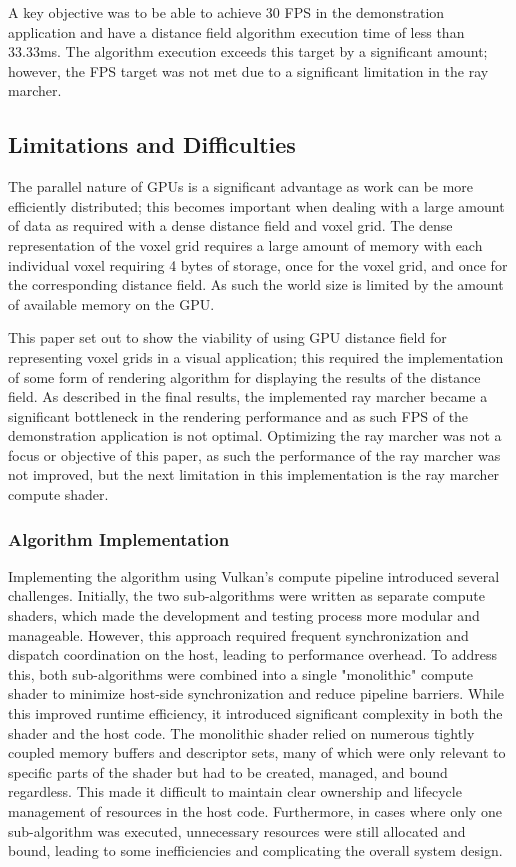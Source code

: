 A key objective was to be able to achieve 30 FPS in the demonstration application and have a distance field algorithm
execution time of less than 33.33ms. The algorithm execution exceeds this target by a significant amount; however,
the FPS target was not met due to a significant limitation in the ray marcher.

\subsection{Limitations and Difficulties}
The parallel nature of GPUs is a significant advantage as work can be more efficiently distributed; this becomes
important when dealing with a large amount of data as required with a dense distance field and voxel grid. The dense
representation of the voxel grid requires a large amount of memory with each individual voxel requiring 4 bytes of
storage, once for the voxel grid, and once for the corresponding distance field. As such the world size is limited by
the amount of available memory on the GPU.

This paper set out to show the viability of using GPU distance field for representing voxel grids in a visual
application; this required the implementation of some form of rendering algorithm for displaying the results of the
distance field. As described in the final results, the implemented ray marcher became a significant bottleneck in the
rendering performance and as such FPS of the demonstration application is not optimal. Optimizing the ray marcher was
not a focus or objective of this paper, as such the performance of the ray marcher was not improved, but the next
limitation in this implementation is the ray marcher compute shader.

\subsubsection{Algorithm Implementation}
Implementing the algorithm using Vulkan’s compute pipeline introduced several challenges. Initially, the two
sub-algorithms were written as separate compute shaders, which made the development and testing process more modular and
manageable. However, this approach required frequent synchronization and dispatch coordination on the host, leading to
performance overhead. To address this, both sub-algorithms were combined into a single "monolithic" compute shader to
minimize host-side synchronization and reduce pipeline barriers. While this improved runtime efficiency, it introduced
significant complexity in both the shader and the host code. The monolithic shader relied on numerous tightly coupled
memory buffers and descriptor sets, many of which were only relevant to specific parts of the shader but had to be
created, managed, and bound regardless. This made it difficult to maintain clear ownership and lifecycle management
of resources in the host code. Furthermore, in cases where only one sub-algorithm was executed, unnecessary resources
were still allocated and bound, leading to some inefficiencies and complicating the overall system design.

